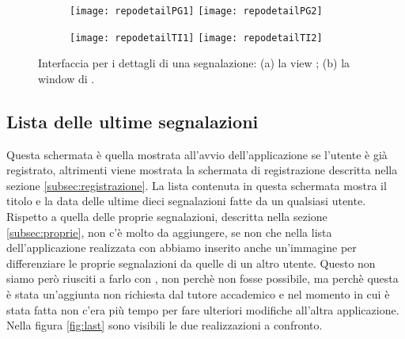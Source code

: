             \newpage
            \begin{figure}[H]
                \centering
                \begin{subfigure}[b]{0.9\textwidth}
                    \texttt{[image: repodetailPG1]}
                    \texttt{[image: repodetailPG2]}
                    \caption{}
                \end{subfigure}
                \begin{subfigure}[b]{0.9\textwidth}
                    \texttt{[image: repodetailTI1]}
                    \texttt{[image: repodetailTI2]}
                    \caption{}
                \end{subfigure}
                \caption{
                    Interfaccia per i dettagli di una segnalazione: (a) la view
                    \kendomob{}; (b) la window di \tisdk{}.
                }
                \label{fig:repodetails}
            \end{figure}

        \subsection{Lista delle ultime segnalazioni}
        Questa schermata è quella mostrata all'avvio dell'applicazione se
        l'utente è già registrato, altrimenti viene mostrata la schermata di
        registrazione descritta nella sezione \ref{subsec:registrazione}.
        La lista contenuta in questa schermata mostra il titolo e la data delle
        ultime dieci segnalazioni
        fatte da un qualsiasi utente. Rispetto a quella delle proprie
        segnalazioni, descritta nella sezione \ref{subsec:proprie}, non c'è
        molto da aggiungere, se non che nella lista dell'applicazione
        realizzata con \tisdk{} abbiamo inserito anche un'immagine per
        differenziare le proprie segnalazioni da quelle di un altro utente.
        Questo non siamo però riusciti a farlo con \kendomob{}, non perchè
        non fosse possibile, ma perchè questa è stata un'aggiunta non richiesta
        dal tutore accademico e nel momento in cui è stata fatta non c'era
        più tempo per fare ulteriori modifiche all'altra applicazione.
        Nella figura
        \ref{fig:last} sono visibili le due realizzazioni a confronto.

